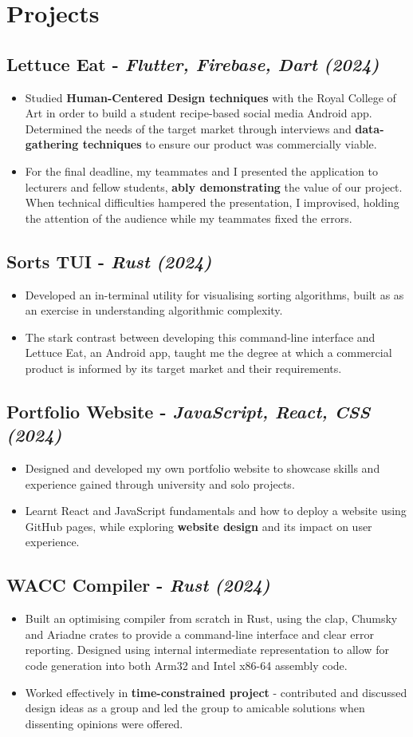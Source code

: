 \documentclass{article}
\newcommand{\dates}[1]{\hfill\textit{(#1)}}
\newcommand{\project}[4]{
    \subsection*{\textbf{#1} - \textit{#3} \dates{#2}}
    \begin{itemize}[topsep=0pt, itemsep=0.05em]
        #4
    \end{itemize}
}
\begin{document}
\section*{Projects}

\project{Lettuce Eat }{2024}{Flutter, Firebase, Dart}{
    \item Studied \textbf{Human-Centered Design techniques} with the Royal College of Art in order to build a student recipe-based social media Android app.
    Determined the needs of the target market through interviews and \textbf{data-gathering techniques} to ensure our product was commercially viable.
    
    \item For the final deadline, my teammates and I presented the application to lecturers and fellow students, \textbf{ably demonstrating}
    the value of our project. When technical difficulties hampered the presentation, I improvised, holding the attention of the audience
    while my teammates fixed the errors.
}


\project{Sorts TUI}{2024}{Rust}{
    \item Developed an in-terminal utility for visualising sorting algorithms, built as as an exercise in understanding algorithmic complexity.
    
    \item The stark contrast between developing this command-line interface and Lettuce Eat, an Android app, taught me the degree at which 
    a commercial product is informed by its target market and their requirements.
}

\project{Portfolio Website}{2024}{JavaScript, React, CSS}{
    \item Designed and developed my own portfolio website to showcase skills and experience gained through university and solo projects.

    \item Learnt React and JavaScript fundamentals and how to deploy a website using GitHub pages, while exploring \textbf{website design} and its impact on 
    user experience.
}

\project{WACC Compiler }{2024}{Rust}{
    \item Built an optimising compiler from scratch in Rust, using the clap, Chumsky and Ariadne crates to provide a command-line interface
    and clear error reporting. Designed using internal intermediate representation to allow for code generation into both
    Arm32 and Intel x86-64 assembly code.

    \item Worked effectively in \textbf{time-constrained project} - contributed and discussed design ideas as a group and led the group to 
    amicable solutions when dissenting opinions were offered. 
}
\end{document}

